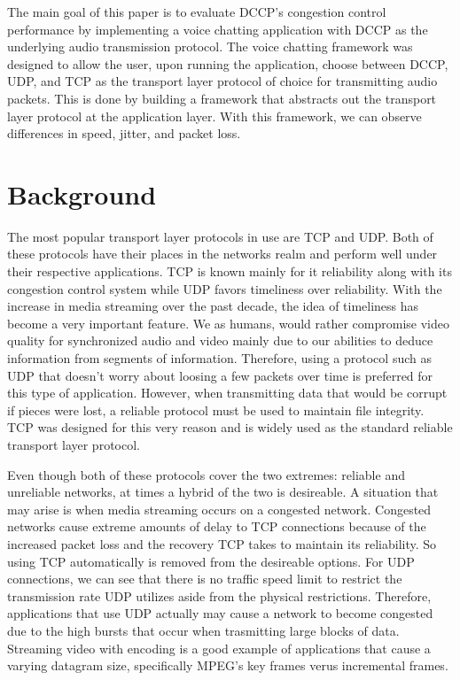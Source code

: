 \documentclass[letterpaper, 9 pt, balance, conference]{ieeeconf}
\begin{document}
The main goal of this paper is to evaluate DCCP's congestion control performance
by implementing a voice chatting application with DCCP as the underlying audio
transmission protocol.  The voice chatting framework was designed to allow the
user, upon running the application, choose between DCCP, UDP, and TCP as the
transport layer protocol of choice for transmitting audio packets. This is done
by building a framework that abstracts out the transport layer protocol at the
application layer. With this framework, we can observe differences in speed, 
jitter, and packet loss.


\section{Background}
\label{sec:backg}

The most popular transport layer protocols in use are TCP and UDP.  Both of these
protocols have their places in the networks realm and perform well under their 
respective applications.  TCP is known mainly for it reliability along with its
congestion control system while UDP favors timeliness over reliability.  With the
increase in media streaming over the past decade, the idea of timeliness has
become a very important feature.  We as humans, would rather compromise video
quality for synchronized audio and video mainly due to our abilities to deduce
information from segments of information.  Therefore, using a protocol such as UDP
that doesn't worry about loosing a few packets over time is preferred for this type 
of application.  However, when transmitting data that would be corrupt if pieces 
were lost, a reliable protocol must be used to maintain file integrity.  TCP was
designed for this very reason and is widely used as the standard reliable transport
layer protocol.

Even though both of these protocols cover the two extremes: reliable and unreliable
networks, at times a hybrid of the two is desireable.  A situation
that may arise is when media streaming occurs on a congested network. 
Congested networks cause extreme amounts of delay to TCP connections because of
the increased packet loss and the recovery TCP takes to maintain its reliability. 
So using TCP automatically is removed from the desireable options.  For
UDP connections, we can see that there is no traffic speed limit to restrict the
transmission rate UDP utilizes aside from the physical restrictions.  Therefore, 
applications that use UDP actually
may cause a network to become congested due to the high bursts that occur when
trasmitting large blocks of data.  Streaming video with encoding is a good example 
of applications that cause a varying datagram size, specifically MPEG's key frames
verus incremental frames.
\end{document}
